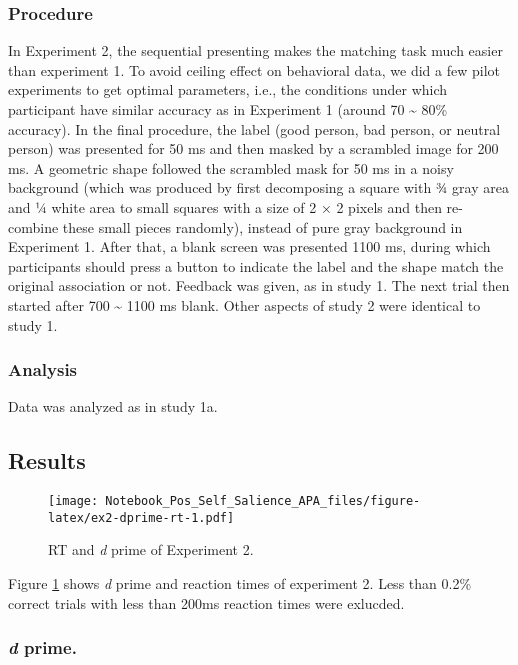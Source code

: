 \documentclass[man]{apa6}
\begin{document}
\hypertarget{procedure-3}{%
\subsubsection{Procedure}\label{procedure-3}}

In Experiment 2, the sequential presenting makes the matching task much easier than experiment 1. To avoid ceiling effect on behavioral data, we did a few pilot experiments to get optimal parameters, i.e., the conditions under which participant have similar accuracy as in Experiment 1 (around 70 \textasciitilde{} 80\% accuracy).
In the final procedure, the label (good person, bad person, or neutral person) was presented for 50 ms and then masked by a scrambled image for 200 ms. A geometric shape followed the scrambled mask for 50 ms in a noisy background (which was produced by first decomposing a square with ¾ gray area and ¼ white area to small squares with a size of 2 × 2 pixels and then re-combine these small pieces randomly), instead of pure gray background in Experiment 1. After that, a blank screen was presented 1100 ms, during which participants should press a button to indicate the label and the shape match the original association or not. Feedback was given, as in study 1. The next trial then started after 700 \textasciitilde{} 1100 ms blank. Other aspects of study 2 were identical to study 1.

\hypertarget{analysis}{%
\subsubsection{Analysis}\label{analysis}}

Data was analyzed as in study 1a.

\hypertarget{results-3}{%
\subsection{Results}\label{results-3}}

\begin{figure}
\centering
\texttt{[image: Notebook\_Pos\_Self\_Salience\_APA\_files/figure-latex/ex2-dprime-rt-1.pdf]}
\caption{\label{fig:ex2-dprime-rt}RT and \emph{d} prime of Experiment 2.}
\end{figure}

Figure \ref{fig:ex2-dprime-rt} shows \emph{d} prime and reaction times of experiment 2. Less than 0.2\% correct trials with less than 200ms reaction times were exlucded.

\hypertarget{d-prime.}{%
\subsubsection{\texorpdfstring{\emph{d} prime.}{d prime.}}\label{d-prime.}}
\end{document}
